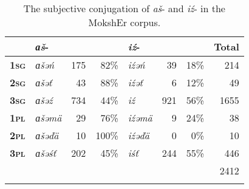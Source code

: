 \documentclass[output=paper]{langsci/langscibook}
\begin{document}
\begin{table}\begin{small}
\caption{The subjective conjugation of \textit{aš}- and \textit{iź}- in the MokshEr corpus.}
\label{tab:2:8}
\begin{tabularx}{\textwidth}{lX rr X rrr}
\lsptoprule
							&\textbf{\textit{ɑš}-}		&			&			&\textbf{\textit{iź}-}	&			&			& \textbf{Total}\\ \midrule
\textbf{\textsc{1sg}}	&\textit{ɑšəń}			&175		& 82\% 	&\textit{iźəń}			&39		&18\% 	&214\\
\textbf{\textsc{2sg}}	&\textit{ɑšəť}				&43		&88\%		&\textit{iźəť}			&6			&12\%		&49\\
\textbf{\textsc{3sg}}	&\textit{ɑšəź}			&734		&44\%		&\textit{iź}				&921		&56\%		&1655\\
\textbf{\textsc{1pl}}		&\textit{ɑšəmä}			&29		&76\% 	&\textit{iźəmä}			&9			&24\%		&38\\
\textbf{\textsc{2pl}}		&\textit{ɑšəďä}			&10		&100\% 	&\textit{iźəďä}			&0 			&0\% 		&10\\
\textbf{\textsc{3pl}}		&\textit{ɑšəśť}			&202		&45\%		&\textit{iśť}				&244		&55\% 	&446\\ \midrule
							&								&			&			&							&			&			& 2412\\
\lspbottomrule
\end{tabularx}\end{small}
\end{table}
\end{document}
